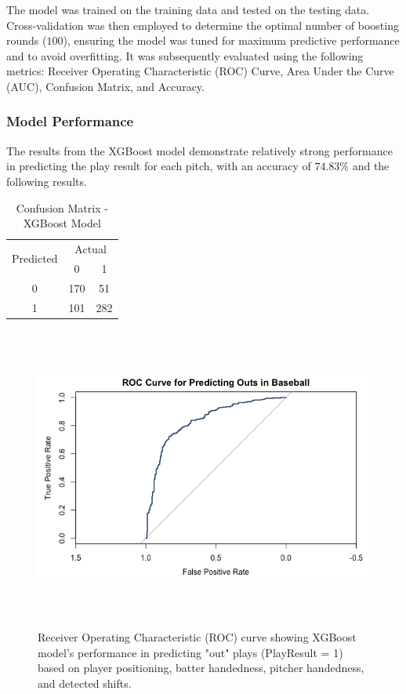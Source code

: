 \documentclass{article}
\begin{document}
The model was trained on the training data and tested on the testing data. Cross-validation was then employed to determine the optimal number of boosting rounds ($100$), ensuring the model was tuned for maximum predictive performance and to avoid overfitting. It was subsequently evaluated using the following metrics: Receiver Operating Characteristic (ROC) Curve, Area Under the Curve (AUC), Confusion Matrix, and Accuracy.


\subsubsection{Model Performance}
The results from the XGBoost model demonstrate relatively strong performance in predicting the play result for each pitch, with an accuracy of $74.83\%$ and the following results. 

\begin{table}[h!]
\centering
\begin{tabular}{|c|c|c|}
\hline
\multirow{2}{*}{Predicted} & \multicolumn{2}{c|}{Actual} \\ \cline{2-3} 
                           & 0   & 1   \\ \hline
0                          & 170  & 51  \\ \hline
1                          & 101 & 282 \\ \hline
\end{tabular}
\caption{Confusion Matrix - XGBoost Model}
\end{table}
\newpage
\begin{figure}[h]
    \centering
    \includegraphics[height=10cm]{images/roc_xgb.png}
    \caption{Receiver Operating Characteristic (ROC) curve showing XGBoost model's performance in predicting "out" plays (PlayResult = 1) based on player positioning, batter handedness, pitcher handedness, and detected shifts.}
\end{figure}
\vspace{.5cm}
\end{document}
